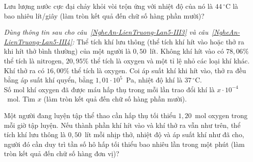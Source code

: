 	\begin{ex}%
		\label{NgheAn-LienTruong-Lan5-III2}Lưu lượng nước cực đại chảy khỏi vòi trộn ứng với nhiệt độ của nó là $44\,^\circ\text{C}$ là bao nhiêu lít/giây (làm tròn kết quả đến chữ số hàng phần mười)?
		\par
	\end{ex}

	\begin{ex}%
		\label{NgheAn-LienTruong-Lan5-III3}\textit{Dùng thông tin sau cho câu~\ref{NgheAn-LienTruong-Lan5-III3} và câu~\ref{NgheAn-LienTruong-Lan5-III4}:} Thể tích khí lưu thông (thể tích khí hít vào hoặc thở ra khi hít thở bình thường) của một người là $0{,}50$~lít. Không khí hít vào có $78{,}06\%$ thể tích là nitrogen, $20{,}95\%$ thể tích là oxygen và một tỉ lệ nhỏ các loại khí khác. Khí thở ra có $16{,}00\%$ thể tích là oxygen. Coi áp suất khí khi hít vào, thở ra đều bằng áp suất khí quyển, bằng $1{,}01\cdot 10^5$~Pa, nhiệt độ khí là $37\,^\circ\text{C}$.\\
		Số mol khí oxygen đã được máu hấp thụ trong mỗi lần trao đổi khí là $x\cdot 10^{-4}$~mol. Tìm $x$ (làm tròn kết quả đến chữ số hàng phần mười).
		\par
	\end{ex}

	\begin{ex}%
		\label{NgheAn-LienTruong-Lan5-III4}Một người đang luyện tập thể thao cần hấp thụ tối thiểu $1{,}20$~mol oxygen trong mỗi giờ tập luyện. Nếu thành phần khí hít vào và khí thở ra vẫn như trên, thể tích khí lưu thông là $0{,}50$~lít mỗi nhịp thở, nhiệt độ và áp suất khí như đã cho, người đó cần duy trì tần số hô hấp tối thiểu bao nhiêu lần trong một phút (làm tròn kết quả đến chữ số hàng đơn vị)?
		\par
	\end{ex}

